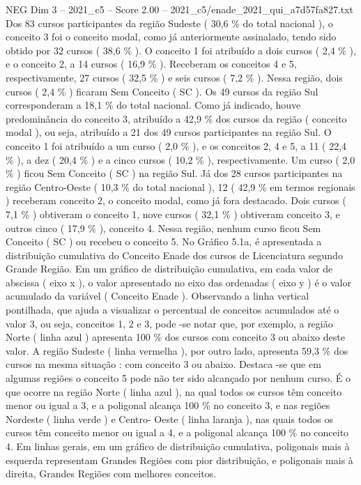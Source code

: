 \begin{textsample}{NEG Dim 3 – 2021\_c5 – Score 2.00 – 2021\_c5/enade\_2021\_qui\_a7d57fa827.txt}
Dos 83 cursos participantes da região Sudeste ( 30,6 \% do total nacional ), o conceito 3 foi o conceito modal, como já anteriormente assinalado, tendo sido obtido por 32 cursos ( 38,6 \% ).
O conceito 1 foi atribuído a dois cursos ( 2,4 \% ), e o conceito 2, a 14 cursos ( 16,9 \% ).
Receberam os conceitos 4 e 5, respectivamente, 27 cursos ( 32,5 \% ) e seis cursos ( 7,2 \% ).
Nessa região, dois cursos ( 2,4 \% ) ficaram Sem Conceito ( SC ).
Os 49 cursos da região Sul corresponderam a 18,1 \% do total nacional.
Como já indicado, houve predominância do conceito 3, atribuído a 42,9 \% dos cursos da região ( conceito modal ), ou seja, atribuído a 21 dos 49 cursos participantes na região Sul.
O conceito 1 foi atribuído a um curso ( 2,0 \% ), e os conceitos 2, 4 e 5, a 11 ( 22,4 \% ), a dez ( 20,4 \% ) e a cinco cursos ( 10,2 \% ), respectivamente.
Um curso ( 2,0 \% ) ficou Sem Conceito ( SC ) na região Sul.
Já dos 28 cursos participantes na região Centro-Oeste ( 10,3 \% do total nacional ), 12 ( 42,9 \% em termos regionais ) receberam conceito 2, o conceito modal, como já fora destacado.
Dois cursos ( 7,1 \% ) obtiveram o conceito 1, nove cursos ( 32,1 \% ) obtiveram conceito 3, e outros cinco ( 17,9 \% ), conceito 4.
Nessa região, nenhum curso ficou Sem Conceito ( SC ) ou recebeu o conceito 5.
No Gráfico 5.1a, é apresentada a distribuição cumulativa do Conceito Enade dos cursos de Licenciatura segundo Grande Região.
Em um gráfico de distribuição cumulativa, em cada valor de abscissa ( eixo x ), o valor apresentado no eixo das ordenadas ( eixo y ) é o valor acumulado da variável ( Conceito Enade ).
Observando a linha vertical pontilhada, que ajuda a visualizar o percentual de conceitos acumulados até o valor 3, ou seja, conceitos 1, 2 e 3, pode -se notar que, por exemplo, a região Norte ( linha azul ) apresenta 100 \% dos cursos com conceito 3 ou abaixo deste valor.
A região Sudeste ( linha vermelha ), por outro lado, apresenta 59,3 \% dos cursos na mesma situação : com conceito 3 ou abaixo.
Destaca -se que em algumas regiões o conceito 5 pode não ter sido alcançado por nenhum curso.
É o que ocorre na região Norte ( linha azul ), na qual todos os cursos têm conceito menor ou igual a 3, e a poligonal alcança 100 \% no conceito 3, e nas regiões Nordeste ( linha verde ) e Centro- Oeste ( linha laranja ), nas quais todos os cursos têm conceito menor ou igual a 4, e a poligonal alcança 100 \% no conceito 4.
Em linhas gerais, em um gráfico de distribuição cumulativa, poligonais mais à esquerda representam Grandes Regiões com pior distribuição, e poligonais mais à direita, Grandes Regiões com melhores conceitos.

\end{textsample}
